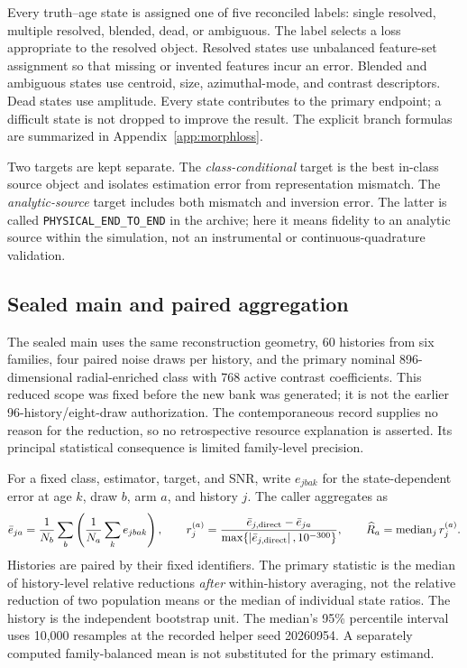 Every truth--age state is assigned one of five reconciled labels: single resolved, multiple resolved, blended, dead, or ambiguous. The label selects a loss appropriate to the resolved object. Resolved states use unbalanced feature-set assignment so that missing or invented features incur an error. Blended and ambiguous states use centroid, size, azimuthal-mode, and contrast descriptors. Dead states use amplitude. Every state contributes to the primary endpoint; a difficult state is not dropped to improve the result. The explicit branch formulas are summarized in Appendix~\ref{app:morphloss}.

Two targets are kept separate. The \emph{class-conditional} target is the best in-class source object and isolates estimation error from representation mismatch. The \emph{analytic-source} target includes both mismatch and inversion error. The latter is called \texttt{PHYSICAL\_END\_TO\_END} in the archive; here it means fidelity to an analytic source within the simulation, not an instrumental or continuous-quadrature validation.

\subsection{Sealed main and paired aggregation}
The sealed main uses the same reconstruction geometry, 60 histories from six families, four paired noise draws per history, and the primary nominal 896-dimensional radial-enriched class with 768 active contrast coefficients. This reduced scope was fixed before the new bank was generated; it is not the earlier 96-history/eight-draw authorization. The contemporaneous record supplies no reason for the reduction, so no retrospective resource explanation is asserted. Its principal statistical consequence is limited family-level precision.

For a fixed class, estimator, target, and SNR, write $e_{jbak}$ for the state-dependent error at age $k$, draw $b$, arm $a$, and history $j$. The caller aggregates as
\begin{equation}
\bar e_{ja}=\frac{1}{N_b}\sum_b\left(\frac{1}{N_a}\sum_k e_{jbak}\right),\qquad
r_j^{(a)}=\frac{\bar e_{j,\rm direct}-\bar e_{ja}}
{\max\{\left\lvert\bar e_{j,\rm direct}\right\rvert,10^{-300}\}},\qquad
\widehat R_a=\operatorname{median}_j r_j^{(a)}.
\label{eq:hmtestimand}
\end{equation}
Histories are paired by their fixed identifiers. The primary statistic is the median of history-level relative reductions \emph{after} within-history averaging, not the relative reduction of two population means or the median of individual state ratios. The history is the independent bootstrap unit. The median's 95\% percentile interval uses 10,000 resamples at the recorded helper seed 20260954. A separately computed family-balanced mean is not substituted for the primary estimand.

